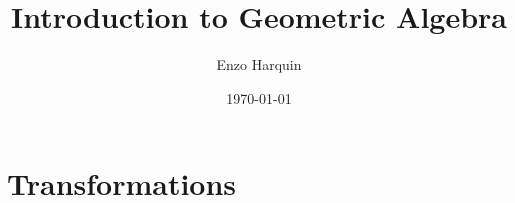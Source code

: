 



\title{Introduction to Geometric Algebra}
\author[Harquin]{Enzo Harquin}
\titlegraphic{}
\date{\today}







% 

% 


% 

\section{Transformations}



